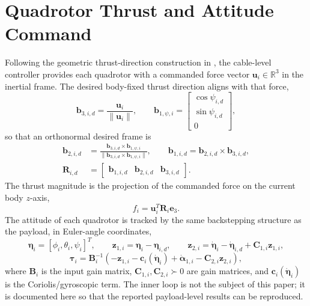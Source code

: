 \documentclass[Review,sageh,times]{sagej}
\begin{document}
\section*{Quadrotor Thrust and Attitude Command}

Following the geometric thrust-direction construction in
\citet{lee2013a,lee2013b}, the cable-level controller provides each quadrotor
with a commanded force vector $\mathbf{u}_i\in\mathbb{R}^3$ in the inertial frame. The
desired body-fixed thrust direction aligns with that force,
\begin{equation}
\mathbf{b}_{3,i,d} = \frac{\mathbf{u}_i}{\|\mathbf{u}_i\|},
\qquad
\mathbf{b}_{1,\psi,i} =
\begin{bmatrix}
\cos\psi_{i,d}\\ \sin\psi_{i,d}\\ 0
\end{bmatrix},
\label{eq:b3d}
\end{equation}
so that an orthonormal desired frame is
\begin{equation}
\begin{aligned}
\mathbf{b}_{2,i,d} &= \frac{\mathbf{b}_{3,i,d}\times\mathbf{b}_{1,\psi,i}}
{\|\mathbf{b}_{3,i,d}\times\mathbf{b}_{1,\psi,i}\|},
\qquad
\mathbf{b}_{1,i,d} = \mathbf{b}_{2,i,d}\times\mathbf{b}_{3,i,d},\\
\mathbf{R}_{i,d} &=
\begin{bmatrix}
\mathbf{b}_{1,i,d} & \mathbf{b}_{2,i,d} & \mathbf{b}_{3,i,d}
\end{bmatrix}.
\end{aligned}
\label{eq:Rid}
\end{equation}
The thrust magnitude is the projection of the commanded force on the current
body $z$-axis,
\begin{equation}
f_i = \mathbf{u}_i^{T}\mathbf{R}_i\mathbf{e}_3 .
\label{eq:thrust}
\end{equation}
The attitude of each quadrotor is tracked by the same backstepping structure
as the payload, in Euler-angle coordinates,
\begin{equation}
\boldsymbol{\eta}_i = [\phi_i,\theta_i,\psi_i]^{T},
\qquad
\mathbf{z}_{1,i} = \boldsymbol{\eta}_i - \boldsymbol{\eta}_{i,d},
\qquad
\mathbf{z}_{2,i} = \dot{\boldsymbol{\eta}}_i - \dot{\boldsymbol{\eta}}_{i,d} + \mathbf{C}_{1,i}\mathbf{z}_{1,i},
\label{eq:z1z2}
\end{equation}
\begin{equation}
\boldsymbol{\tau}_i = \mathbf{B}_i^{-1}
\left(-\mathbf{z}_{1,i} - \mathbf{c}_i(\dot{\boldsymbol{\eta}}_i) + \dot{\boldsymbol{\alpha}}_{1,i}
- \mathbf{C}_{2,i}\mathbf{z}_{2,i}\right),
\label{eq:taui}
\end{equation}
where $\mathbf{B}_i$ is the input gain matrix, $\mathbf{C}_{1,i},\mathbf{C}_{2,i}\succ0$ are gain
matrices, and $\mathbf{c}_i(\dot{\boldsymbol{\eta}}_i)$ is the Coriolis/gyroscopic term. The
inner loop is not the subject of this paper; it is documented here so that
the reported payload-level results can be reproduced.
\end{document}
